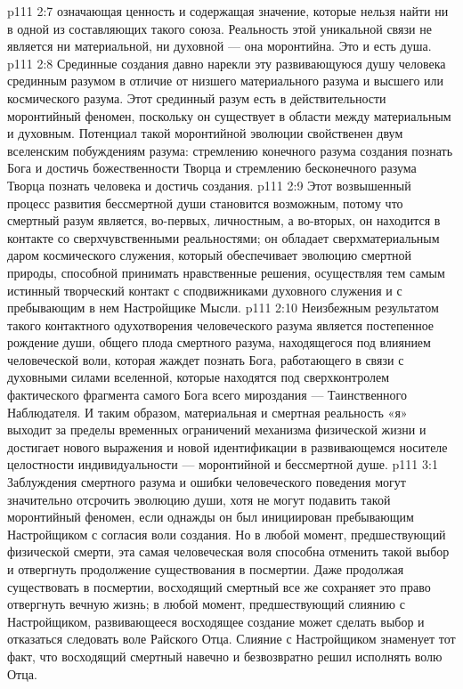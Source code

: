 \vs p111 2:7 \pc {}\bibnobreakspace {} означающая ценность и содержащая значение, которые нельзя найти ни в одной из составляющих такого союза. Реальность этой уникальной связи не является ни материальной, ни духовной --- она моронтийна. Это и есть душа.
\vs p111 2:8 \pc Срединные создания давно нарекли эту развивающуюся душу человека срединным разумом в отличие от низшего материального разума и высшего или космического разума. Этот срединный разум есть в действительности моронтийный феномен, поскольку он существует в области между материальным и духовным. Потенциал такой моронтийной эволюции свойственен двум вселенским побуждениям разума: стремлению конечного разума создания познать Бога и достичь божественности Творца и стремлению бесконечного разума Творца познать человека и достичь  создания.
\vs p111 2:9 Этот возвышенный процесс развития бессмертной души становится возможным, потому что смертный разум является, во\hyp{}первых, личностным, а во\hyp{}вторых, он находится в контакте со сверхчувственными реальностями; он обладает сверхматериальным даром космического служения, который обеспечивает эволюцию смертной природы, способной принимать нравственные решения, осуществляя тем самым истинный творческий контакт с сподвижниками духовного служения и с пребывающим в нем Настройщике Мысли.
\vs p111 2:10 Неизбежным результатом такого контактного одухотворения человеческого разума является постепенное рождение души, общего плода смертного разума, находящегося под влиянием человеческой воли, которая жаждет познать Бога, работающего в связи с духовными силами вселенной, которые находятся под сверхконтролем фактического фрагмента самого Бога всего мироздания --- Таинственного Наблюдателя. И таким образом, материальная и смертная реальность «я» выходит за пределы временных ограничений механизма физической жизни и достигает нового выражения и новой идентификации в развивающемся носителе целостности индивидуальности --- моронтийной и бессмертной душе.
\vs p111 3:1 Заблуждения смертного разума и ошибки человеческого поведения могут значительно отсрочить эволюцию души, хотя не могут подавить такой моронтийный феномен, если однажды он был инициирован пребывающим Настройщиком с согласия воли создания. Но в любой момент, предшествующий физической смерти, эта самая человеческая воля способна отменить такой выбор и отвергнуть продолжение существования в посмертии. Даже продолжая существовать в посмертии, восходящий смертный все же сохраняет это право отвергнуть вечную жизнь; в любой момент, предшествующий слиянию с Настройщиком, развивающееся восходящее создание может сделать выбор и отказаться следовать воле Райского Отца. Слияние с Настройщиком знаменует тот факт, что восходящий смертный навечно и безвозвратно решил исполнять волю Отца.
